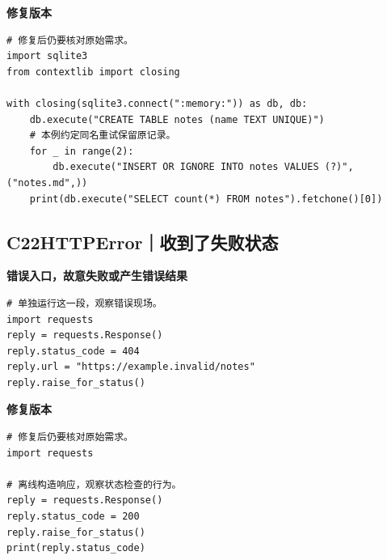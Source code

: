 \textbf{修复版本}

\begin{lstlisting}[title={\code{case_21.py}}]
# 修复后仍要核对原始需求。
import sqlite3
from contextlib import closing

with closing(sqlite3.connect(":memory:")) as db, db:
    db.execute("CREATE TABLE notes (name TEXT UNIQUE)")
    # 本例约定同名重试保留原记录。
    for _ in range(2):
        db.execute("INSERT OR IGNORE INTO notes VALUES (?)", ("notes.md",))
    print(db.execute("SELECT count(*) FROM notes").fetchone()[0])
\end{lstlisting}


\subsection*{C22\enspace HTTPError｜收到了失败状态}





\textbf{错误入口，故意失败或产生错误结果}

\begin{lstlisting}[style=errorcode,title={错误复现（故意失败或错误结果）：\code{case_22_bad.py.txt}}]
# 单独运行这一段，观察错误现场。
import requests
reply = requests.Response()
reply.status_code = 404
reply.url = "https://example.invalid/notes"
reply.raise_for_status()
\end{lstlisting}

\textbf{修复版本}

\begin{lstlisting}[title={\code{case_22.py}}]
# 修复后仍要核对原始需求。
import requests

# 离线构造响应，观察状态检查的行为。
reply = requests.Response()
reply.status_code = 200
reply.raise_for_status()
print(reply.status_code)
\end{lstlisting}



